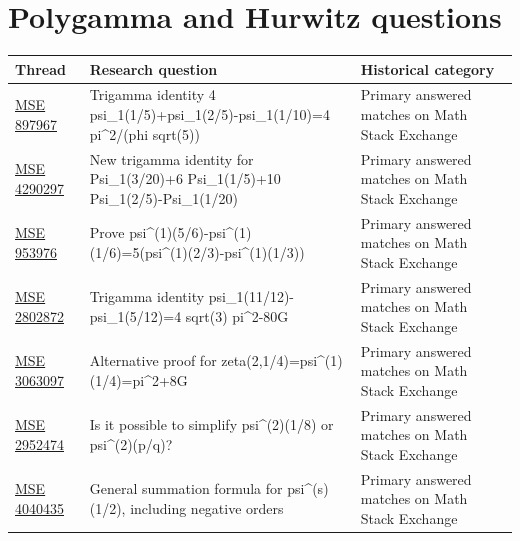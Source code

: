 \section{Polygamma and Hurwitz questions}
\small
\begin{longtable}{@{}p{}p{}p{}@{}}
\toprule Thread & Research question & Historical category\\\midrule
\endhead
\href{https://math.stackexchange.com/questions/897967/trigamma-identity-4-psi-1-left-frac15-right-psi-1-left-frac25-right}{MSE 897967} & Trigamma identity 4 psi\_1(1/5)+psi\_1(2/5)-psi\_1(1/10)=4 pi\textasciicircum{}2/(phi sqrt(5)) & Primary answered matches on Math Stack Exchange\\
\href{https://math.stackexchange.com/questions/4290297/new-trigamma-identity-for-psi-1-frac3206-psi-1-frac1510-psi-1-fra}{MSE 4290297} & New trigamma identity for Psi\_1(3/20)+6 Psi\_1(1/5)+10 Psi\_1(2/5)-Psi\_1(1/20) & Primary answered matches on Math Stack Exchange\\
\href{https://math.stackexchange.com/questions/953976/prove-psi1-left-frac-56-right-psi1-left-frac-16-right-5-left}{MSE 953976} & Prove psi\textasciicircum{}(1)(5/6)-psi\textasciicircum{}(1)(1/6)=5(psi\textasciicircum{}(1)(2/3)-psi\textasciicircum{}(1)(1/3)) & Primary answered matches on Math Stack Exchange\\
\href{https://math.stackexchange.com/questions/2802872/trigamma-identity-psi-1-left-frac1112-right-psi-1-left-frac512-rig}{MSE 2802872} & Trigamma identity psi\_1(11/12)-psi\_1(5/12)=4 sqrt(3) pi\textasciicircum{}2-80G & Primary answered matches on Math Stack Exchange\\
\href{https://math.stackexchange.com/questions/3063097/alternative-proof-for-zeta-left2-frac14-right-psi1-left-frac14-right}{MSE 3063097} & Alternative proof for zeta(2,1/4)=psi\textasciicircum{}(1)(1/4)=pi\textasciicircum{}2+8G & Primary answered matches on Math Stack Exchange\\
\href{https://math.stackexchange.com/questions/2952474/is-it-possible-to-simplify-psi2-frac18-or-psi2-frac-pq}{MSE 2952474} & Is it possible to simplify psi\textasciicircum{}(2)(1/8) or psi\textasciicircum{}(2)(p/q)? & Primary answered matches on Math Stack Exchange\\
\href{https://math.stackexchange.com/questions/4040435/is-there-a-general-summation-formula-for-the-polygamma-function-at-z-1-2-i-e}{MSE 4040435} & General summation formula for psi\textasciicircum{}(s)(1/2), including negative orders & Primary answered matches on Math Stack Exchange\\

\end{longtable}
